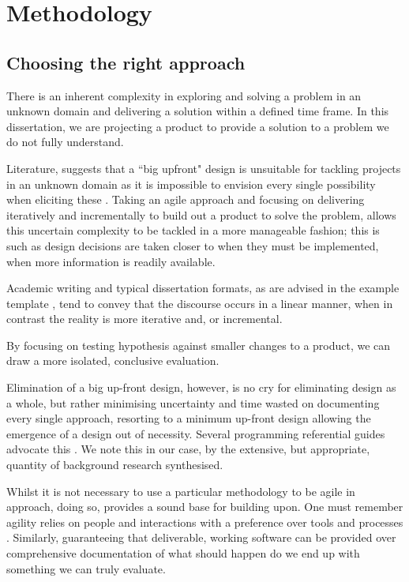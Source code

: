 \chapter{Methodology}

\section{Choosing the right approach}

There is an inherent complexity in exploring and solving a problem in an unknown domain and delivering a solution within a defined time frame. In this dissertation, we are projecting a product to provide a solution to a problem we do not fully understand. 

Literature, suggests that a ``big upfront" design is unsuitable for tackling projects in an unknown domain as it is impossible to envision every single possibility when eliciting these \parencite{fowler2001design}. Taking an agile approach and focusing on delivering iteratively and incrementally to build out a product to solve the problem, allows this uncertain complexity to be tackled in a more manageable fashion; this is such as design decisions are taken closer to when they must be implemented, when more information is readily available. 

Academic writing and typical dissertation formats, as are advised in the example template \parencite{dissertationTemplateKent}, tend to convey that the discourse occurs in a linear manner, when in contrast the reality is more iterative and, or incremental. 

By focusing on testing hypothesis against smaller changes to a product, we can draw a more isolated, conclusive evaluation.

Elimination of a big up-front design, however, is no cry for eliminating design as a whole, but rather minimising uncertainty and time wasted on documenting every single approach, resorting to a minimum up-front design allowing the emergence of a design out of necessity. Several programming referential guides advocate this \parencite{codeComplete}. We note this in our case, by the extensive, but appropriate, quantity of background research synthesised.

Whilst it is not necessary to use a particular methodology to be agile in approach, doing so, provides a sound base for building upon. One must remember agility relies on people and interactions with a preference over tools and processes \parencite{beck2001agile}. Similarly, guaranteeing that deliverable, working software can be provided over comprehensive documentation of what should happen do we end up with something we can truly evaluate. 

